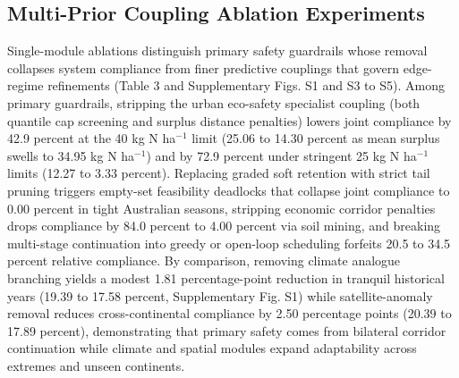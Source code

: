 \documentclass[11pt,a4paper]{article}
\begin{document}
\subsection{Multi-Prior Coupling Ablation Experiments}

Single-module ablations distinguish primary safety guardrails whose removal collapses system compliance from finer predictive couplings that govern edge-regime refinements (Table 3 and Supplementary Figs. S1 and S3 to S5). Among primary guardrails, stripping the urban eco-safety specialist coupling (both quantile cap screening and surplus distance penalties) lowers joint compliance by 42.9 percent at the 40 kg N ha$^{-1}$ limit (25.06 to 14.30 percent as mean surplus swells to 34.95 kg N ha$^{-1}$) and by 72.9 percent under stringent 25 kg N ha$^{-1}$ limits (12.27 to 3.33 percent). Replacing graded soft retention with strict tail pruning triggers empty-set feasibility deadlocks that collapse joint compliance to 0.00 percent in tight Australian seasons, stripping economic corridor penalties drops compliance by 84.0 percent to 4.00 percent via soil mining, and breaking multi-stage continuation into greedy or open-loop scheduling forfeits 20.5 to 34.5 percent relative compliance. By comparison, removing climate analogue branching yields a modest 1.81 percentage-point reduction in tranquil historical years (19.39 to 17.58 percent, Supplementary Fig. S1) while satellite-anomaly removal reduces cross-continental compliance by 2.50 percentage points (20.39 to 17.89 percent), demonstrating that primary safety comes from bilateral corridor continuation while climate and spatial modules expand adaptability across extremes and unseen continents.
\end{document}
